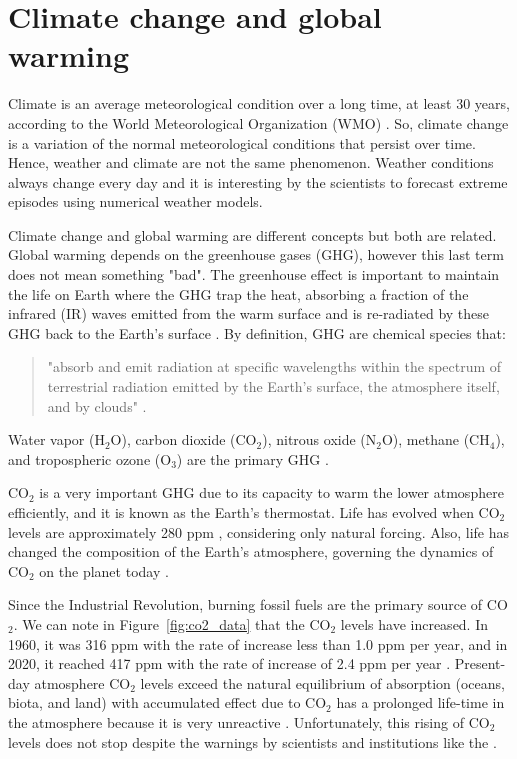 \section{Climate change and global warming}\label{sec:climate change}
Climate is an average meteorological condition over a long time, at least 30 years, according to the World Meteorological Organization (WMO) \citep{IPCC2013}. 
So, climate change is a variation of the normal meteorological conditions that persist over time.
Hence, weather and climate are not the same phenomenon.
Weather conditions always change every day and it is interesting by the scientists to forecast extreme episodes using numerical weather models.

Climate change and global warming are different concepts but both are related.
Global warming depends on the greenhouse gases (GHG), however this last term does not mean something "bad".
The greenhouse effect is important to maintain the life on Earth where the GHG trap the heat, absorbing a fraction of the infrared (IR) waves emitted from the warm surface and is re-radiated by these GHG back to the Earth's surface \citep{Farmer2013}.
By definition, GHG are chemical species that: 
\begin{quote}
    "absorb and emit radiation at specific wavelengths within the spectrum of terrestrial radiation emitted by the Earth's surface, the atmosphere itself, and by clouds" \citep{IPCC2013}. 
\end{quote}
Water vapor (H$_2$O), carbon dioxide (CO$_2$), nitrous oxide (N$_2$O), methane (CH$_4$), and tropospheric ozone (O$_3$) are the primary GHG \citep{IPCC2013, Von2015}.

CO$_2$ is a very important GHG due to its capacity to warm the lower atmosphere efficiently, and it is known as the Earth's thermostat.
Life has evolved when CO$_2$ levels are approximately 280 ppm \citep{Farmer2013}, considering only natural forcing. 
Also, life has changed the composition of the Earth's atmosphere, governing the dynamics of CO$_2$ on the planet today \citep{Kasting1993}.

Since the Industrial Revolution, burning fossil fuels are the primary source of CO$_2$.
We can note in Figure~\ref{fig:co2_data} that the CO$_2$ levels have increased.
In 1960, it was 316 ppm with the rate of increase less than 1.0 ppm per year, and in 2020, it reached 417 ppm with the rate of increase of 2.4 ppm per year \citep{Tans2021, Letcher2021}.
Present-day atmosphere CO$_2$ levels exceed the natural equilibrium of absorption (oceans, biota, and land) with accumulated effect due to CO$_2$ has a prolonged life-time in the atmosphere because it is very unreactive \citep{Letcher2021}.
Unfortunately, this rising of CO$_2$ levels does not stop despite the warnings by scientists and institutions like the \citet{IPCC2013}.

